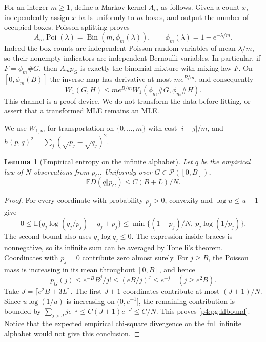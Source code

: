 \documentclass[11pt,a4paper]{article}
\newtheorem{lemma}[theorem]{Lemma}
\theoremstyle{definition}
\theoremstyle{remark}
\numberwithin{equation}{section}
\begin{document}
For an integer $m\ge1$, define a Markov kernel $A_m$ as follows.  Given
a count $x$, independently assign $x$ balls uniformly to $m$ boxes,
and output the number of occupied boxes.  Poisson splitting proves
\begin{equation}\label{p4:pg:occupancy}
 A_m\operatorname{Poi}(\lambda)
 =\operatorname{Bin}(m,\phi_m(\lambda)),\qquad
 \phi_m(\lambda)=1-e^{-\lambda/m}.
\end{equation}
Indeed the box counts are independent Poisson random variables of
mean $\lambda/m$, so their nonempty indicators are independent
Bernoulli variables.  In particular, if $F=\phi_m\#G$, then
$A_mp_G$ is exactly the binomial mixture with mixing law $F$.
On $[0,\phi_m(B)]$ the inverse map has derivative at most
$m e^{B/m}$, and consequently
\begin{equation}\label{p4:pg:backmap}
 W_1(G,H)\le m e^{B/m}
                 W_1(\phi_m\#G,\phi_m\#H).
\end{equation}
This channel is a proof device.  We do not transform the data before
fitting, or assert that a transformed MLE remains an MLE.

We use $W_{1,m}$ for transportation on $\{0,\ldots,m\}$ with cost
$|i-j|/m$, and $h(p,q)^2=\sum_j(\sqrt{p_j}-\sqrt{q_j})^2$.

\begin{lemma}[Empirical entropy on the infinite alphabet]\label{p4:pg:kl}
Let $q$ be the empirical law of $N$ observations from $p_G$.
Uniformly over $G\in\mathcal P([0,B])$,
\begin{equation}\label{p4:pg:klbound}
                    \mathbb E D(q\Vert p_G)\le C(B+L)/N.
\end{equation}
\end{lemma}
\begin{proof}
For every coordinate with probability $p_j>0$, convexity and
$\log u\le u-1$ give
\[
 0\le\mathbb E\{q_j\log(q_j/p_j)-q_j+p_j\}
 \le\min\{(1-p_j)/N,\ p_j\log(1/p_j)\}.
\]
The second bound also uses $q_j\log q_j\le0$.  The expression inside
braces is nonnegative, so its infinite sum can be averaged by
Tonelli's theorem.  Coordinates with $p_j=0$ contribute zero almost
surely.  For $j\ge B$, the Poisson mass is increasing in its mean
throughout $[0,B]$, and hence
\[
 p_G(j)\le e^{-B}B^j/j!\le(eB/j)^j\le e^{-j}
                         \quad(j\ge e^2B).
\]
Take $J=\lceil e^2B+3L\rceil$.  The first $J+1$ coordinates
contribute at most $(J+1)/N$.  Since $u\log(1/u)$ is increasing
on $(0,e^{-1}]$, the remaining contribution is bounded by
$\sum_{j>J}j e^{-j}\le C(J+1)e^{-J}\le C/N$.
This proves \eqref{p4:pg:klbound}.  Notice that the expected empirical
chi-square divergence on the full infinite alphabet would not give
this conclusion.
\end{proof}
\end{document}
